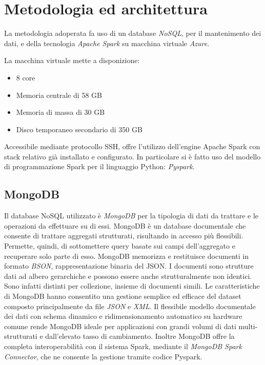 \chapter{Metodologia ed architettura}
La metodologia adoperata fa uso di un database \emph{NoSQL}, per il mantenimento dei dati, e della tecnologia \emph{Apache Spark} su macchina virtuale \emph{Azure}.\par 
La macchina virtuale mette a disponizione:
\begin{itemize}
	\item 8 core
	\item Memoria centrale di 58 GB
	\item Memoria di massa di 30 GB
	\item Disco temporaneo secondario di 350 GB
\end{itemize}
Accessibile mediante protocollo SSH, offre l'utilizzo dell'engine Apache Spark con stack relativo già installato e configurato. In particolare si è fatto uso del modello di programmazione Spark per il linguaggio Python: \emph{Pyspark}.\par
\section{MongoDB}
Il database NoSQL utilizzato è \emph{MongoDB} per la tipologia di dati da trattare e le operazioni da effettuare su di essi. MongoDB è un database documentale che consente di trattare aggregati strutturati, risultando in accesso più flessibili. Permette, quindi, di sottomettere query basate sui campi dell'aggregato e recuperare solo parte di esso. MongoDB memorizza e restituisce documenti in formato \emph{BSON}, rappresentazione binaria del JSON. I documenti sono strutture dati ad albero gerarchiche e possono essere anche strutturalmente non identici. Sono infatti distinti per collezione, insieme di documenti simili. Le caratteristiche di MongoDB hanno consentito una gestione semplice ed efficace del dataset composto principalmente da file \emph{JSON} e \emph{XML}. Il flessibile modello documentale dei dati con schema dinamico e ridimensionamento automatico su hardware comune rende MongoDB ideale per applicazioni con grandi volumi di dati multi-strutturati e dall'elevato tasso di cambiamento. Inoltre MongoDB offre la completa interoperabilità con il sistema Spark, mediante il \emph{MongoDB Spark Connector}, che ne consente la gestione tramite codice Pyspark.

